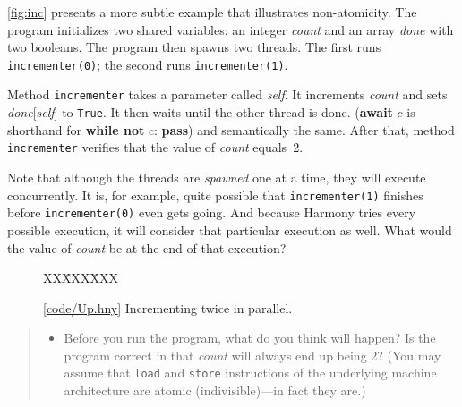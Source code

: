 \documentclass{report}
\newcommand{\harmonysource}[1]{
\begin{tabbing}
XX\=XXX\=XXX\kill
    
\end{tabbing}
}
\newcommand{\harmonylink}[1]{%
[\href{https://harmony.cs.cornell.edu/#1}{\underline{#1}}]%
}
\newenvironment{code}{
\tcolorbox
}{
\endtcolorbox
}
\begin{document}
\autoref{fig:inc} presents a more subtle example that illustrates
non-atomicity.
The program initializes two shared variables:
an integer \textit{count} and
an array \textit{done} with two booleans.
The program then spawns two threads.
The first runs \texttt{incrementer(0)}; the second runs
\texttt{incrementer(1)}.

Method \texttt{incrementer} takes a parameter called \textit{self}.
It increments \textit{count} and sets \textit{done}[\textit{self}] to \texttt{True}.
It then waits until the other thread is done.
(\textbf{await} $c$ is shorthand for \textbf{while not} $c$: \textbf{pass}) and semantically the same.
After that, method \texttt{incrementer}
verifies that the value of \textit{count} equals~2.

Note that although the threads are \emph{spawned} one at a time,
they will execute concurrently.  It is, for example, quite possible
that \texttt{incrementer(1)} finishes before \texttt{incrementer(0)}
even gets going.
And because Harmony tries every possible execution, it will consider
that particular execution as well.
What would the value of \textit{count} be at the end of that execution?

\begin{figure}[h]
\begin{code}
\harmonysource{Up}
\end{code}
\caption{\harmonylink{code/Up.hny} Incrementing twice in parallel.}
\label{fig:inc}
\end{figure}

\begin{quote}
\begin{itemize}
\item Before you run the program, what do you think will happen?  Is the
program correct in that \textit{count} will always end up being 2?
(You may assume that \texttt{load} and \texttt{store} instructions of the
underlying machine architecture are atomic (indivisible)---in fact they are.)
\end{itemize}
\end{quote}

%
\end{document}
